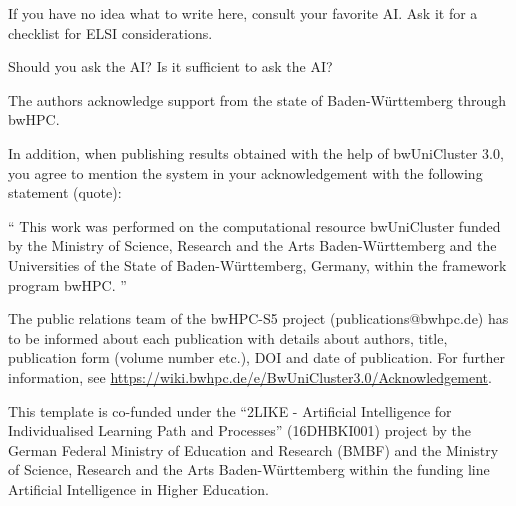 \documentclass[sigconf, review, nonacm]{acmart}
\begin{document}
\begin{tcolorbox}[title=Instructions: How to write an ELSI statement?]
If you have no idea what to write here, consult your favorite AI. Ask it for a checklist for ELSI considerations. 

Should you ask the AI?
Is it sufficient to ask the AI?
\end{tcolorbox}


\begin{acks}

The authors acknowledge support from the state of Baden-Württemberg through bwHPC.



In addition, when publishing results obtained with the help of bwUniCluster 3.0, you agree to mention the system in your acknowledgement with the following statement (quote):

``
This work was performed on the computational resource bwUniCluster funded by the Ministry of Science, Research and the Arts Baden-Württemberg and the Universities of the State of Baden-Württemberg, Germany, within the framework program bwHPC.
''

The public relations team of the bwHPC-S5 project (publications@bwhpc.de) has to be informed about each publication with details about authors, title, publication form (volume number etc.), DOI and date of publication. 
For further information, see \url{https://wiki.bwhpc.de/e/BwUniCluster3.0/Acknowledgement}.


This template is co-funded under the ``2LIKE - Artificial Intelligence for Individualised Learning Path and Processes'' (16DHBKI001)  project by the German Federal Ministry of Education and Research (BMBF) and the Ministry of Science, Research and the Arts Baden-Württemberg within the funding line Artificial Intelligence in Higher Education. 

\mysupervisorrole




\end{acks}
\end{document}

